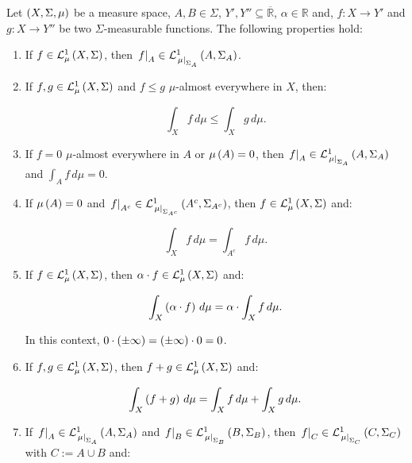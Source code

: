\begin{proposition}
  Let $\pr{X,\Sigma,\mu}$ be a measure space, $A,B\in\Sigma$, $Y',Y''\subseteq\overline{\mathbb{R}}$, $\alpha\in\mathbb{R}$ and, $f:X\rightarrow Y'$ and $g:X\rightarrow Y''$ be two $\Sigma$-measurable functions. The following properties hold:

  \begin{enumerate}
    \item If $f\in\Leb{X}{\Sigma}{\mu}$, then $\rest{f}{A}\in\Leb{A}{\Sigma_A}{\rest{\mu}{\Sigma_A}}$.
    \item If $f,g\in\Leb{X}{\Sigma}{\mu}$ and $f\leq g$ $\mu$-almost everywhere in $X$, then:
    
    \begin{equation}
      \int_{X}{f\,d\mu}\leq\int_{X}{g\,d\mu}.
    \end{equation}
    \item If $f=0$ $\mu$-almost everywhere in $A$ or $\mu\pr{A}=0$, then $\rest{f}{A}\in\Leb{A}{\Sigma_A}{\rest{\mu}{\Sigma_A}}$ and $\int_{A}{f\,d\mu}=0$.
    \item If $\mu\pr{A}=0$ and $\rest{f}{A^c}\in\Leb{A^c}{\Sigma_{A^c}}{\rest{\mu}{\Sigma_{A^c}}}$, then $f\in\Leb{X}{\Sigma}{\mu}$ and:
    
    \begin{equation}
      \int_{X}{f\,d\mu}=\int_{A^c}{f\,d\mu}.
    \end{equation}
    \item If $f\in\Leb{X}{\Sigma}{\mu}$, then $\alpha\cdot f\in\Leb{X}{\Sigma}{\mu}$ and:
    
    \begin{equation}
      \int_{X}{\pr{\alpha\cdot f}\,d\mu}=\alpha\cdot\int_{X}{f\,d\mu}.
    \end{equation}

    In this context, $0\cdot\pr{\pm\infty}=\pr{\pm\infty}\cdot 0=0$.
    \item If $f,g\in\Leb{X}{\Sigma}{\mu}$, then $f+g\in\Leb{X}{\Sigma}{\mu}$ and:
    
    \begin{equation}
      \int_{X}{\pr{f+g}\,d\mu}=\int_{X}{f\,d\mu}+\int_{X}{g\,d\mu}.
    \end{equation}
    \item If $\rest{f}{A}\in\Leb{A}{\Sigma_A}{\rest{\mu}{\Sigma_A}}$ and $\rest{f}{B}\in\Leb{B}{\Sigma_B}{\rest{\mu}{\Sigma_B}}$, then $\rest{f}{C}\in\Leb{C}{\Sigma_C}{\rest{\mu}{\Sigma_C}}$ with $C:=A\cup B$ and:
    

\end{enumerate}
\end{proposition}

